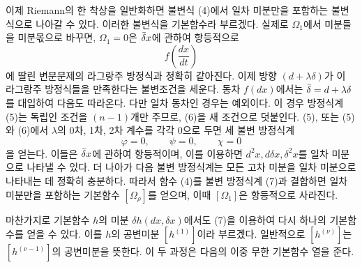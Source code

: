 이제 Riemann의 한 착상을 일반화하면 불변식 (4)에서 일차 미분만을 포함하는 불변식으로 나아갈 수 있다. 이러한 불변식을 \glqq{}기본함수\grqq{}라 부르겠다. 실제로 \(\Omega_1\)에서 미분들을 미분몫으로 바꾸면, \(\Omega_1=0\)은 \(\bar{\delta} x\)에 관하여 항등적으로
\[
f\!\left(\frac{dx}{dt}\right)
\]
에 딸린 변분문제의 라그랑주 방정식과 정확히 같아진다. 이제 방향 \((d+\lambda\delta)\)가 이 라그랑주 방정식들을 만족한다는 불변조건을 세운다.
동차 \(f(dx)\)에서는 \(\bar{\delta}=d+\lambda\delta\)를 대입하여 다음도 따라온다.
다만 일차 동차인 경우는 예외이다. 이 경우 방정식계 (5)는 독립인 조건을 \((n-1)\)개만 주므로, (6)을 새 조건으로 덧붙인다. (5), 또는 (5)와 (6)에서 \(\lambda\)의 0차, 1차, 2차 계수를 각각 0으로 두면 세 불변 방정식계
\[
\varphi=0,\qquad\psi=0,\qquad\chi=0
\]
을 얻는다. 이들은 \(\bar{\delta} x\)에 관하여 항등적이며, 이를 이용하면 \(d^2x,d\delta x,\delta^2x\)를 일차 미분으로 나타낼 수 있다. 더 나아가 다음 불변 방정식계는 모든 고차 미분을 일차 미분으로 나타내는 데 정확히 충분하다.
따라서 함수 (4)를 불변 방정식계 (7)과 결합하면 일차 미분만을 포함하는 기본함수 \([\Omega_\rho]\)를 얻으며, 이때 \([\Omega_1]\)은 항등적으로 사라진다.

마찬가지로 기본함수 \(h\)의 미분 \(\delta h(dx,\delta x)\)에서도 (7)을 이용하여 다시 하나의 기본함수를 얻을 수 있다. 이를 \(h\)의 \glqq{}공변미분\grqq{} \([h^{(1)}]\)이라 부르겠다. 일반적으로 \([h^{(\nu)}]\)는 \([h^{(\nu-1)}]\)의 공변미분을 뜻한다. 이 두 과정은 다음의 이중 무한 기본함수 열을 준다.

